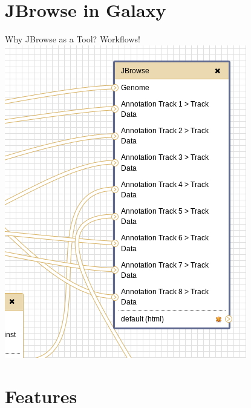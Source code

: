 \documentclass[12pt]{beamer} %
\begin{document}
\section{JBrowse in Galaxy}
\begin{frame}{Why JBrowse as a Tool? Workflows!}
	\centering
	\includegraphics[width=\textwidth,height=0.8\textheight,keepaspectratio]{snapshot17.png}
\end{frame}


\section{Features}
\end{document}
